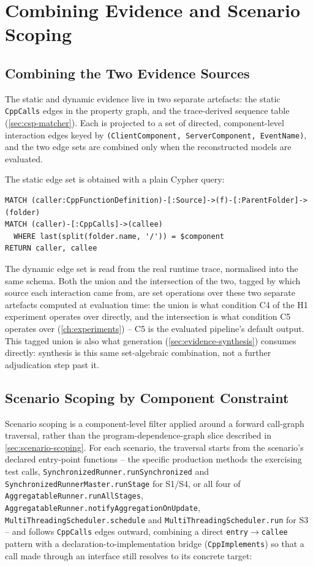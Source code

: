 \section{Combining Evidence and Scenario Scoping}\label{sec:combine-scope}

\subsection{Combining the Two Evidence Sources}

The static and dynamic evidence live in two separate artefacts: the
static \texttt{CppCalls} edges in the property graph, and the
trace-derived sequence table (\cref{sec:csp-matcher}). Each is projected
to a set of directed, component-level interaction edges keyed by
\texttt{(ClientComponent, ServerComponent, EventName)}, and the two edge
sets are combined only when the reconstructed models are evaluated.

The static edge set is obtained with a plain Cypher query:

\begin{verbatim}
MATCH (caller:CppFunctionDefinition)-[:Source]->(f)-[:ParentFolder]->(folder)
MATCH (caller)-[:CppCalls]->(callee)
  WHERE last(split(folder.name, '/')) = $component
RETURN caller, callee
\end{verbatim}

The dynamic edge set is read from the real runtime trace, normalised
into the same schema. Both the union and the intersection of the two,
tagged by which source each interaction came from, are set operations
over these two separate artefacts computed at evaluation time: the union
is what condition C4 of the H1 experiment operates over directly, and
the intersection is what condition C5 operates over
(\cref{ch:experiments}) -- C5 is the evaluated pipeline's default
output. This tagged union is also
what \sysml generation (\cref{sec:evidence-synthesis}) consumes directly:
synthesis is this same set-algebraic combination, not a further
adjudication step past it.

\subsection{Scenario Scoping by Component Constraint}\label{sec:scoping-impl}

Scenario scoping is a component-level filter applied around a forward
call-graph traversal, rather than the program-dependence-graph slice
described in \cref{sec:scenario-scoping}. For each scenario, the
traversal starts from the scenario's declared entry-point functions --
the specific production methods the exercising test calls, \eg
\texttt{SynchronizedRunner.runSynchronized} and
\texttt{SynchronizedRunnerMaster.runStage} for S1/S4, or all four of
\texttt{AggregatableRunner.runAllStages},
\texttt{AggregatableRunner.notifyAggregationOnUpdate},
\texttt{MultiThreadingScheduler.schedule} and
\texttt{MultiThreadingScheduler.run} for S3 -- and follows
\texttt{CppCalls} edges outward, combining a direct
\texttt{entry}$\to$\texttt{callee} pattern with a
declaration-to-implementation bridge (\texttt{CppImplements}) so that a
call made through an interface still resolves to its concrete target:

